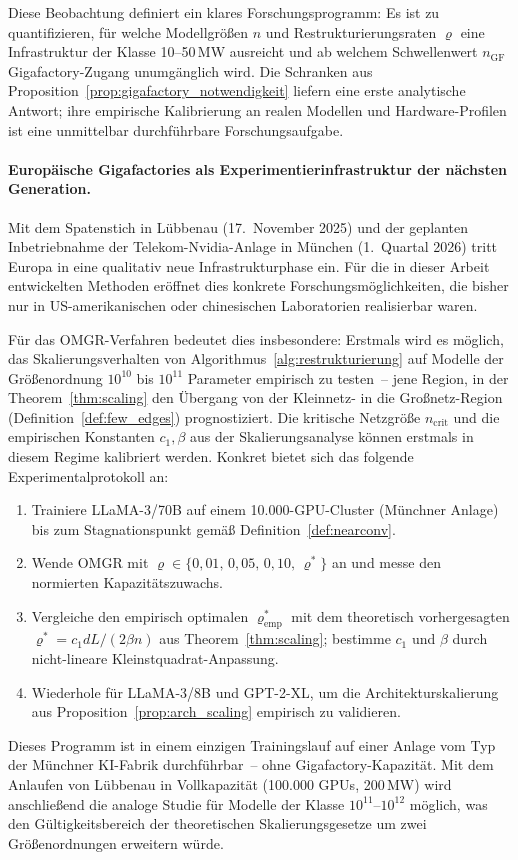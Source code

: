 ﻿\documentclass[12pt, a4paper, openany]{report}
\begin{document}
Diese Beobachtung definiert ein klares Forschungsprogramm: Es ist zu
quantifizieren, für welche Modellgrößen $n$ und Restrukturierungsraten
$\varrho$ eine Infrastruktur der Klasse 10--50\,MW ausreicht und ab
welchem Schwellenwert $n_{\mathrm{GF}}$ Gigafactory-Zugang unumgänglich
wird.  Die Schranken aus Proposition~\ref{prop:gigafactory_notwendigkeit}
liefern eine erste analytische Antwort; ihre empirische Kalibrierung an
realen Modellen und Hardware-Profilen ist eine unmittelbar
durchführbare Forschungsaufgabe.

\paragraph{Europäische Gigafactories als Experimentierinfrastruktur
  der nächsten Generation.}
Mit dem Spatenstich in Lübbenau (17.~November 2025) und der geplanten
Inbetriebnahme der Telekom-Nvidia-Anlage in München (1.~Quartal 2026)
tritt Europa in eine qualitativ neue Infrastrukturphase ein.  Für die
in dieser Arbeit entwickelten Methoden eröffnet dies konkrete
Forschungsmöglichkeiten, die bisher nur in US-amerikanischen oder
chinesischen Laboratorien realisierbar waren.

Für das OMGR-Verfahren bedeutet dies insbesondere: Erstmals wird es
möglich, das Skalierungsverhalten von
Algorithmus~\ref{alg:restrukturierung} auf Modelle der Größenordnung
$10^{10}$ bis $10^{11}$ Parameter empirisch zu testen~-- jene Region,
in der Theorem~\ref{thm:scaling} den Übergang von der Kleinnetz- in die
Großnetz-Region (Definition~\ref{def:few_edges}) prognostiziert.  Die
kritische Netzgröße $n_{\mathrm{crit}}$ und die empirischen Konstanten
$c_1, \beta$ aus der Skalierungsanalyse können erstmals in diesem Regime
kalibriert werden.  Konkret bietet sich das folgende
Experimentalprotokoll an:
\begin{enumerate}[label=(\roman*)]
  \item Trainiere LLaMA-3/70B auf einem 10.000-GPU-Cluster (Münchner
    Anlage) bis zum Stagnationspunkt gemäß
    Definition~\ref{def:nearconv}.
  \item Wende OMGR mit
    $\varrho \in \{0{,}01,\, 0{,}05,\, 0{,}10,\, \varrho^*\}$ an und
    messe den normierten Kapazitätszuwachs.
  \item Vergleiche den empirisch optimalen $\varrho_{\mathrm{emp}}^*$ mit
    dem theoretisch vorhergesagten
    $\varrho^* = c_1 dL / (2\beta n)$ aus Theorem~\ref{thm:scaling};
    bestimme $c_1$ und $\beta$ durch nicht-lineare
    Kleinstquadrat-Anpassung.
  \item Wiederhole für LLaMA-3/8B und GPT-2-XL, um die
    Architekturskalierung aus Proposition~\ref{prop:arch_scaling}
    empirisch zu validieren.
\end{enumerate}
Dieses Programm ist in einem einzigen Trainingslauf auf einer Anlage
vom Typ der Münchner KI-Fabrik durchführbar~-- ohne Gigafactory-Kapazität.
Mit dem Anlaufen von Lübbenau in Vollkapazität (100.000 GPUs, 200\,MW)
wird anschließend die analoge Studie für Modelle der
Klasse $10^{11}$--$10^{12}$ möglich, was den Gültigkeitsbereich der
theoretischen Skalierungsgesetze um zwei Größenordnungen erweitern würde.
\end{document}
